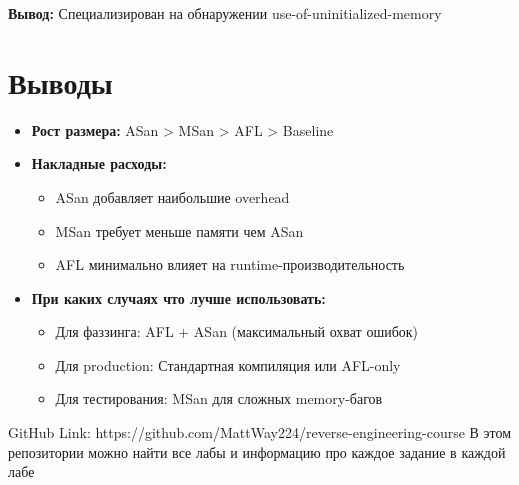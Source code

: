     \textbf{Вывод:} Специализирован на обнаружении use-of-uninitialized-memory


    \section{Выводы}
    \begin{itemize}
        \item \textbf{Рост размера:} ASan > MSan > AFL > Baseline
        \item \textbf{Накладные расходы:}
        \begin{itemize}
            \item ASan добавляет наибольшие overhead
            \item MSan требует меньше памяти чем ASan
            \item AFL минимально влияет на runtime-производительность
        \end{itemize}
        \item \textbf{При каких случаях что лучше использовать:}
        \begin{itemize}
            \item Для фаззинга: AFL + ASan (максимальный охват ошибок)
            \item Для production: Стандартная компиляция или AFL-only
            \item Для тестирования: MSan для сложных memory-багов
        \end{itemize}
    \end{itemize}
    \begin{thebibliography}{1}
        GitHub Link: https://github.com/MattWay224/reverse-engineering-course
        В этом репозитории можно найти все лабы и информацию про каждое задание в каждой лабе
    \end{thebibliography}
